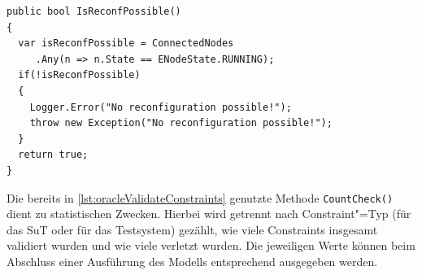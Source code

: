 \begin{lstlisting}[label=lst:oracleIsReconfPossible,style=cs,
caption={Prüfung nach der Möglichkeit weiterer Rekonfigurationen}]
public bool IsReconfPossible()
{
  var isReconfPossible = ConnectedNodes
     .Any(n => n.State == ENodeState.RUNNING);
  if(!isReconfPossible)
  {
    Logger.Error("No reconfiguration possible!");
    throw new Exception("No reconfiguration possible!");
  }
  return true;
}
\end{lstlisting}

Die bereits in \cref{lst:oracleValidateConstraints} genutzte Methode \texttt{CountCheck()} dient zu statistischen Zwecken.
Hierbei wird getrennt nach Constraint"=Typ (für das \gls{SuT} oder für das Testsystem) gezählt, wie viele Constraints insgesamt validiert wurden und wie viele verletzt wurden.
Die jeweiligen Werte können beim Abschluss einer Ausführung des Modells entsprechend ausgegeben werden.
